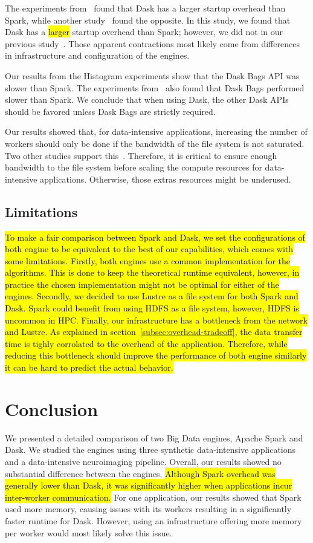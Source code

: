 \documentclass[AMA,STIX1COL]{WileyNJD-v2}
\newcommand{\HL}[1]{\hl{#1}}
\begin{document}
The experiments from~\cite{Mehta:17} found that Dask has a larger startup overhead than Spark, while another study~\cite{8588652} found the opposite.
In this study, we found that Dask has a \HL{larger} startup overhead than Spark; however, we did not in our previous study~\cite{8943502}.
Those apparent contractions most likely come from differences in infrastructure and configuration of the engines.
										
Our results from the Histogram experiments show that the Dask Bags API was slower than Spark.
The experiments from~\cite{10.1145/3225058.3225128} also found that Dask Bags performed slower than Spark.
We conclude that when using Dask, the other Dask APIs should be favored unless Dask Bags are strictly required.
										
Our results showed that, for data-intensive applications, increasing the number of workers should only be done if the bandwidth of the file system is not saturated.
Two other studies support this~\cite{8943502, 8588652}.
Therefore, it is critical to ensure enough bandwidth to the file system before scaling the compute resources for data-intensive applications.
Otherwise, those extras resources might be underused.
		
\subsection{Limitations}
\HL{
	To make a fair comparison between Spark and Dask, we set the configurations of both
	engine to be equivalent to the best of our capabilities, which comes with some limitations.
	Firstly, both engines use a common implementation for the algorithms.
	This is done to keep the theoretical runtime equivalent, however, in practice the
	chosen implementation might not be optimal for either of the engines.
	Secondly, we decided to use Lustre as a file system for both Spark and Dask.
	Spark could benefit from using HDFS as a file system, however, HDFS is uncommon in HPC.
	Finally, our infrastructure has a bottleneck from the network and Lustre.
	As explained in section~{\ref{subsec:overhead-tradeoff}}, the data transfer time is tighly corrolated to the overhead of the application.
	Therefore, while reducing this bottleneck should improve the performance of both engine similarly
	it can be hard to predict the actual behavior.
}
		
\section{Conclusion}
We presented a detailed comparison of two Big Data engines, Apache Spark and Dask.
We studied the engines using three synthetic data-intensive applications and a data-intensive neuroimaging pipeline.
Overall, our results showed no substantial difference between the engines.
\HL{Although Spark overhead was generally lower than Dask, it was significantly higher when applications incur inter-worker communication.}
For one application, our results showed that Spark used more memory, causing issues with its workers resulting in a significantly faster runtime for Dask.
However, using an infrastructure offering more memory per worker would most likely solve this issue.
											
\end{document}

